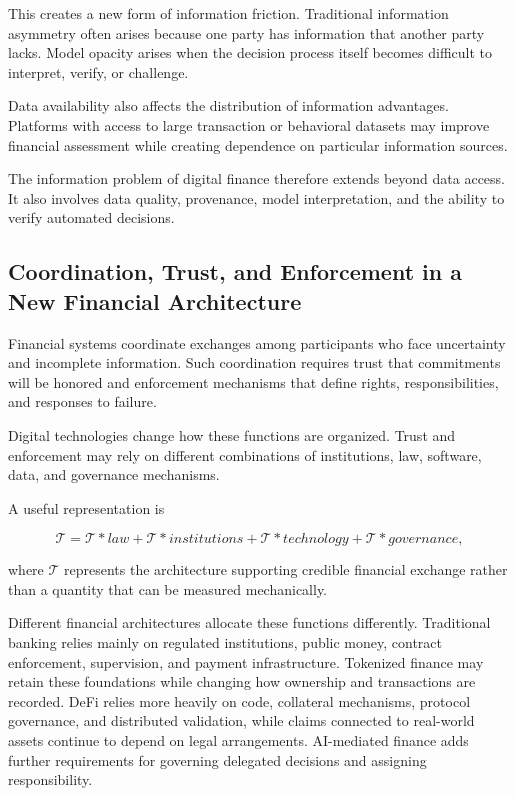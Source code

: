 This creates a new form of information friction. Traditional information asymmetry often arises because one party has information that another party lacks. Model opacity arises when the decision process itself becomes difficult to interpret, verify, or challenge.

Data availability also affects the distribution of information advantages. Platforms with access to large transaction or behavioral datasets may improve financial assessment while creating dependence on particular information sources.

The information problem of digital finance therefore extends beyond data access. It also involves data quality, provenance, model interpretation, and the ability to verify automated decisions.


\subsection{Coordination, Trust, and Enforcement in a New Financial Architecture}

Financial systems coordinate exchanges among participants who face uncertainty and incomplete information. Such coordination requires trust that commitments will be honored and enforcement mechanisms that define rights, responsibilities, and responses to failure.

Digital technologies change how these functions are organized. Trust and enforcement may rely on different combinations of institutions, law, software, data, and governance mechanisms.

A useful representation is

\begin{equation}
\mathcal{T}
=
\mathcal{T}*{law}
+
\mathcal{T}*{institutions}
+
\mathcal{T}*{technology}
+
\mathcal{T}*{governance},
\label{eq:ch24-trust-architecture}
\end{equation}

where \(\mathcal{T}\) represents the architecture supporting credible financial exchange rather than a quantity that can be measured mechanically.

Different financial architectures allocate these functions differently. Traditional banking relies mainly on regulated institutions, public money, contract enforcement, supervision, and payment infrastructure. Tokenized finance may retain these foundations while changing how ownership and transactions are recorded. DeFi relies more heavily on code, collateral mechanisms, protocol governance, and distributed validation, while claims connected to real-world assets continue to depend on legal arrangements. AI-mediated finance adds further requirements for governing delegated decisions and assigning responsibility.

